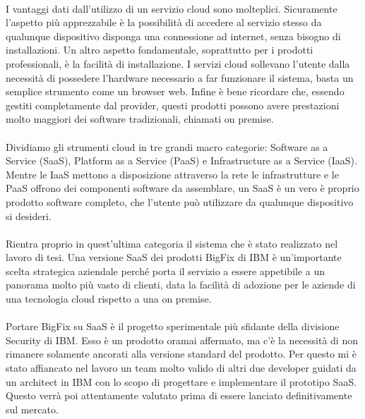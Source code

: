 \paragraph{}
I vantaggi dati dall'utilizzo di un servizio cloud sono molteplici. Sicuramente l'aspetto più apprezzabile è la possibilità di accedere al servizio stesso da qualunque dispositivo disponga una connessione ad internet, senza bisogno di installazioni. Un altro aspetto fondamentale, soprattutto per i prodotti professionali, è la facilità di installazione. I servizi cloud sollevano l'utente dalla necessità di possedere l'hardware necessario a far funzionare il sistema, basta un semplice strumento come un browser web. Infine è bene ricordare che, essendo gestiti completamente dal provider, questi prodotti possono avere prestazioni molto maggiori dei software tradizionali, chiamati on premise.
\paragraph{}
Dividiamo gli strumenti cloud in tre grandi macro categorie: Software as a Service (SaaS), Platform as a Service (PaaS) e Infrastructure as a Service (IaaS). Mentre le IaaS mettono a disposizione attraverso la rete le infrastrutture e le PaaS offrono dei componenti software da assemblare, un SaaS è un vero è proprio prodotto software completo, che l'utente può utilizzare da qualunque dispositivo si desideri.

\paragraph{}
Rientra proprio in quest'ultima categoria il sistema che è stato realizzato nel lavoro di tesi. Una versione SaaS dei prodotti BigFix di IBM è un'importante scelta strategica aziendale perché porta il servizio a essere appetibile a un panorama molto più vasto di clienti, data la facilità di adozione per le aziende di una tecnologia cloud rispetto a una on premise.
\paragraph{}
Portare BigFix su SaaS è il progetto sperimentale più sfidante della divisione Security di IBM. Esso è un prodotto oramai affermato, ma c'è la necessità di non rimanere solamente ancorati alla versione standard del prodotto. Per questo mi è stato affiancato nel lavoro un team molto valido di altri due developer guidati da un architect in IBM con lo scopo di progettare e implementare il prototipo SaaS. Questo verrà poi attentamente valutato prima di essere lanciato definitivamente sul mercato.

